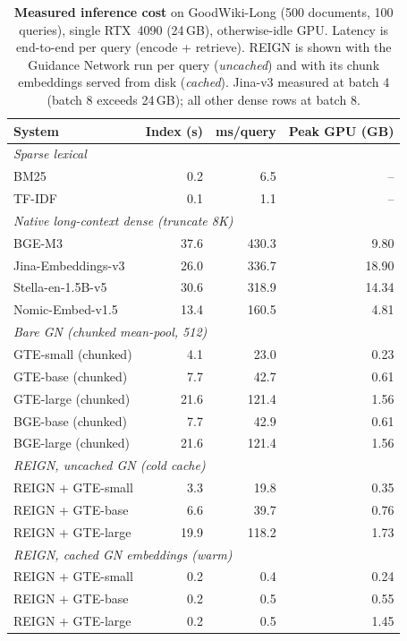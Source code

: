 \begin{table}[t]
\centering
\small
\caption{\textbf{Measured inference cost} on GoodWiki-Long (500 documents, 100 queries), single RTX~4090 (24\,GB), otherwise-idle GPU. Latency is end-to-end per query (encode + retrieve). REIGN is shown with the Guidance Network run per query (\emph{uncached}) and with its chunk embeddings served from disk (\emph{cached}). Jina-v3 measured at batch 4 (batch 8 exceeds 24\,GB); all other dense rows at batch 8.}
\label{tab:measured_efficiency}
\begin{tabular}{lrrr}
\toprule
\textbf{System} & \textbf{Index (s)} & \textbf{ms/query} & \textbf{Peak GPU (GB)} \\
\midrule
\multicolumn{4}{l}{\emph{Sparse lexical}}\\
BM25 & 0.2 & 6.5 & -- \\
TF-IDF & 0.1 & 1.1 & -- \\
\multicolumn{4}{l}{\emph{Native long-context dense (truncate 8K)}}\\
BGE-M3 & 37.6 & 430.3 & 9.80 \\
Jina-Embeddings-v3 & 26.0 & 336.7 & 18.90 \\
Stella-en-1.5B-v5 & 30.6 & 318.9 & 14.34 \\
Nomic-Embed-v1.5 & 13.4 & 160.5 & 4.81 \\
\multicolumn{4}{l}{\emph{Bare GN (chunked mean-pool, 512)}}\\
GTE-small (chunked) & 4.1 & 23.0 & 0.23 \\
GTE-base (chunked) & 7.7 & 42.7 & 0.61 \\
GTE-large (chunked) & 21.6 & 121.4 & 1.56 \\
BGE-base (chunked) & 7.7 & 42.9 & 0.61 \\
BGE-large (chunked) & 21.6 & 121.4 & 1.56 \\
\multicolumn{4}{l}{\emph{REIGN, uncached GN (cold cache)}}\\
REIGN + GTE-small & 3.3 & 19.8 & 0.35 \\
REIGN + GTE-base & 6.6 & 39.7 & 0.76 \\
REIGN + GTE-large & 19.9 & 118.2 & 1.73 \\
\multicolumn{4}{l}{\emph{REIGN, cached GN embeddings (warm)}}\\
REIGN + GTE-small & 0.2 & 0.4 & 0.24 \\
REIGN + GTE-base & 0.2 & 0.5 & 0.55 \\
REIGN + GTE-large & 0.2 & 0.5 & 1.45 \\
\bottomrule
\end{tabular}
\end{table}
